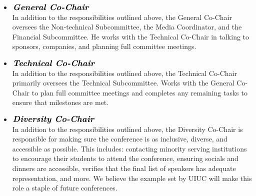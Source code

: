 \begin{itemize}
	\item $\large\textbf{\textit{General Co-Chair}}$\\
	In addition to the responsibilities outlined above, the General Co-Chair oversees the
	Non-technical Subcommittee, the Media Coordinator, and the Financial Subcommittee. He works with the Technical Co-Chair in talking to sponsors, companies, and planning full committee meetings. 
	\item $\large\textbf{\textit{Technical Co-Chair}}$\\
	In addition to the responsibilities outlined above, the Technical Co-Chair primarily oversees the
	Technical Subcommittee. Works with the General Co-Chair to plan full committee meetings and completes any remaining tasks to ensure that milestones are met.
	\item $\large\textbf{\textit{Diversity Co-Chair}}$\\
	In addition to the responsibilities outlined above, the Diversity Co-Chair is responsible for making sure the conference is as inclusive, diverse, and accessible as possible. This includes: contacting minority serving institutions to encourage their students to attend the conference, ensuring socials and dinners are accessible, verifies that the final list of speakers has adequate representation, and more. We believe the example set by UIUC will make this role a staple of future conferences.


\end{itemize}
